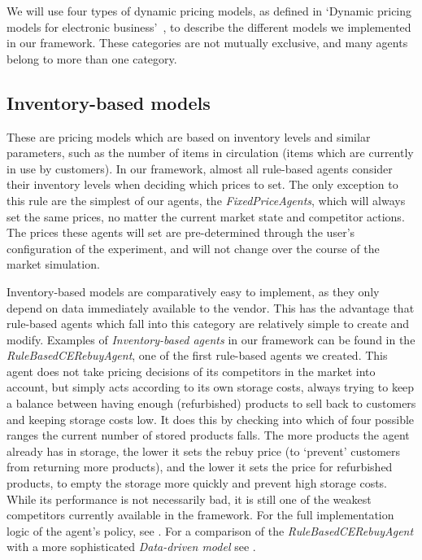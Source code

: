 We will use four types of dynamic pricing models, as defined in `Dynamic pricing models for electronic business'~\cite{dynamicPricingModels}, to describe the different models we implemented in our framework. These categories are not mutually exclusive, and many agents belong to more than one category.

\subsection{Inventory-based models}\label{subsec:InventoryBasedModels}

These are pricing models which are based on inventory levels and similar parameters, such as the number of items in circulation (items which are currently in use by customers). In our framework, almost all rule-based agents consider their inventory levels when deciding which prices to set. The only exception to this rule are the simplest of our agents, the \emph{FixedPriceAgents}, which will always set the same prices, no matter the current market state and competitor actions. The prices these agents will set are pre-determined through the user's configuration of the experiment, and will not change over the course of the market simulation.

Inventory-based models are comparatively easy to implement, as they only depend on data immediately available to the vendor. This has the advantage that rule-based agents which fall into this category are relatively simple to create and modify. Examples of \emph{Inventory-based agents} in our framework can be found in the \emph{RuleBasedCERebuyAgent}, one of the first rule-based agents we created. This agent does not take pricing decisions of its competitors in the market into account, but simply acts according to its own storage costs, always trying to keep a balance between having enough (refurbished) products to sell back to customers and keeping storage costs low. It does this by checking into which of four possible ranges the current number of stored products falls. The more products the agent already has in storage, the lower it sets the rebuy price (to `prevent' customers from returning more products), and the lower it sets the price for refurbished products, to empty the storage more quickly and prevent high storage costs. While its performance is not necessarily bad, it is still one of the weakest competitors currently available in the framework. For the full implementation logic of the agent's policy, see . For a comparison of the \emph{RuleBasedCERebuyAgent} with a more sophisticated \emph{Data-driven model} see .

